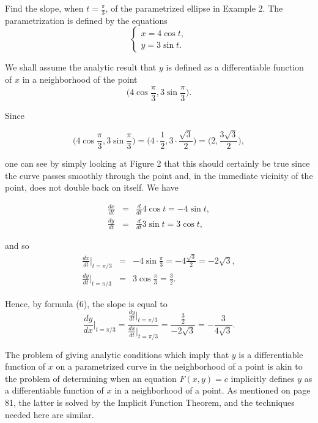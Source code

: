 \begin{example} Find the slope, when $t = \frac{\pi}{3}$, of the parametrized ellipse in Example 2. The parametrization is defined by the equations
$$
\left \{ \begin{array}{l}
x= 4\cos t, \\
y = 3 \sin t.
\end{array}
\right.
$$
 
\noindent We shall assume the analytic result that $y$ is defined as a differentiable function of $x$ in a neighborhood of the point
$$
\Big(4 \cos \frac{\pi}{3},  3 \sin \frac{\pi}{3} \Big).
$$

\noindent Since

$$
\Big(4 \cos \frac{\pi}{3}, 3 \sin \frac{\pi}{3} \Big) = \Big(4 \cdot \frac{1}{2}, 3 \cdot \frac{\sqrt 3}{2} \Big) = \Big(2 , \frac{3 \sqrt 3}{2} \Big) ,
$$

\noindent one can see by simply looking at Figure 2 that this should certainly be true since the curve passes smoothly through the point and, in the immediate vicinity of the point, does not double back on itself. We have

\begin{eqnarray*}
\frac{dx}{dt} &=& \frac{d}{dt} 4 \cos t = - 4 \sin t ,\\
\frac{dy}{dt} &=& \frac{d}{dt} 3 \sin t = 3 \cos t ,
\end{eqnarray*}


\noindent and so
\begin{eqnarray*}
\frac{dx}{dt}\Big|_{t=\pi/3} &=& -4 \sin \frac{\pi}{3} = -4 \frac{\sqrt 3}{2} = - 2\sqrt 3, \\
\frac{dy}{dt}\Big|_{t=\pi/3} &=& 3 \cos \frac{\pi}{3} = \frac{3}{2} . 
\end{eqnarray*}

\noindent Hence, by formula (6), the slope is equal to
$$
\frac{dy}{dx}\Big|_{t=\pi/3} = \frac{\frac{dy}{dt}\Big|_{t=\pi/3}}{\frac{dx}{dt}\Big|_{t=\pi/3}} = \frac{\frac{3}{2}}{-2 \sqrt 3} = - \frac{3}{4 \sqrt 3} .
$$
\end{example}

The problem of giving analytic conditions which imply that $y$ is a differentiable function of $x$ on a parametrized curve in the neighborhood of a point is akin to the problem of determining when an equation $F(x, y) = c$ implicitly defines $y$ as a differentiable function of $x$ in a neighborhood of a point. As mentioned on page 81, the latter is solved by the Implicit Function Theorem, and the techniques needed here are similar.

